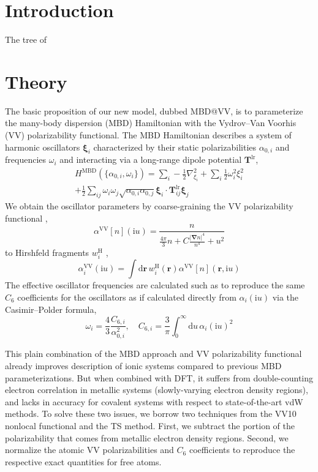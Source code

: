 \section{Introduction}

The tree of 

\section{Theory}

The basic proposition of our new model, dubbed MBD@VV, is to parameterize the many-body dispersion (MBD) Hamiltonian with the Vydrov–Van Voorhis (VV) polarizability functional.
The MBD Hamiltonian \citep{TkatchenkoPRL12,TkatchenkoJCP13,Blood-ForsytheCS16} describes a system of harmonic oscillators $\boldsymbol\xi_i$ characterized by their static polarizabilities $\alpha_{0,i}$ and frequencies $\omega_i$ and interacting via a long-range dipole potential $\mathbf T^\text{lr}$,
\begin{multline}
  H^\text{MBD}(\{\alpha_{0,i},\omega_i\})=\sum_i-\frac12\nabla_{\xi_i}^2+\sum_i\frac12\omega_i^2\xi_i^2 \\
  +\frac12\sum_{ij}\omega_i\omega_j\sqrt{\alpha_{0,i}\alpha_{0,j}}\boldsymbol{\xi}_i\cdot\mathbf T^\text{lr}_{ij}\boldsymbol{\xi}_j
\end{multline}
We obtain the oscillator parameters by coarse-graining \citep{SatoJCP09,SatoJCP10} the VV polarizability functional \citep{VydrovPRL09,VydrovJCP10a,VydrovPRA10},
\begin{equation}
   \alpha^\text{VV}[n](\mathrm iu)=\frac{n}{\frac{4\pi}3n+C\frac{|\boldsymbol\nabla n|^4}{n^4}+u^2}
   \label{eq:vv-functional}
\end{equation}
to Hirshfeld fragments $w_i^\text{H}$ \citep{HirshfeldTCA77},
\begin{equation}
  \alpha_i^\text{VV}(\mathrm iu)=\int\mathrm d\mathbf r\,w_i^\text{H}(\mathbf r)\alpha^\text{VV}[n](\mathbf r,\mathrm iu)
\end{equation}
The effective oscillator frequencies are calculated such as to reproduce the same $C_6$ coefficients for the oscillators as if calculated directly from $\alpha_i(\mathrm iu)$ via the Casimir--Polder formula,
\begin{equation}
  \omega_i=\frac43\frac{C_{6,i}}{\alpha_{0,i}^2},\quad
  C_{6,i}=\frac3\pi\int_0^\infty\mathrm du\,\alpha_i(\mathrm iu)^2
\end{equation}

This plain combination of the MBD approach and VV polarizability functional already improves description of ionic systems compared to previous MBD parameterizations.
But when combined with DFT, it suffers from double-counting electron correlation in metallic systems (slowly-varying electron density regions), and lacks in accuracy for covalent systems with respect to state-of-the-art vdW methods.
To solve these two issues, we borrow two techniques from the VV10 nonlocal functional and the TS method.
First, we subtract the portion of the polarizability that comes from metallic electron density regions.
Second, we normalize the atomic VV polarizabilities and $C_6$ coefficients to reproduce the respective exact quantities for free atoms.

